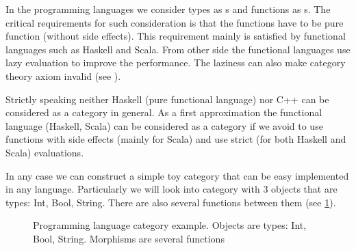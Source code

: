 In the programming languages we consider types as
s and functions as
s. The critical requirements for such
consideration is that the functions have to be pure function (without
side effects). This requirement mainly is satisfied by functional
languages such as Haskell and Scala. From other side the functional
languages use lazy evaluation to improve the performance. The laziness
can also make category theory axiom invalid (see
). 

Strictly speaking neither Haskell (pure functional language) nor C++
can be considered as a category in general. As a first approximation
the functional language (Haskell, Scala) can be considered as a
category if we avoid to use functions with side effects (mainly for
Scala) and use strict (for both Haskell and Scala) evaluations. 


In any case we can construct a simple toy category that can be easy
implemented in any language. Particularly we will look into category
with 3 objects that are types: Int, Bool, String. There are also
several functions between them (see \cref{fig:pl_example}).   

\begin{figure}
  \centering
  \caption{Programming language category example. Objects are types: Int,
    Bool, String. Morphisms are several functions}
  \label{fig:pl_example}
\end{figure}


